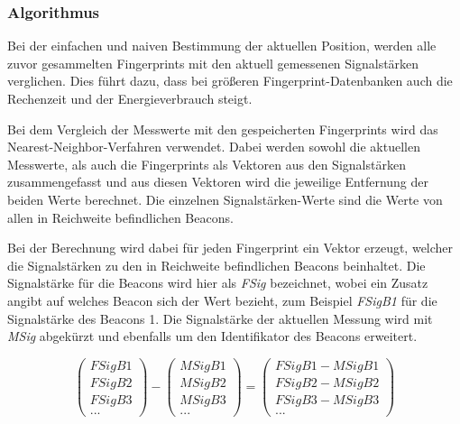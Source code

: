 \subsubsection{Algorithmus}
\label{sec:implementation:fingerprinting:positioning:naiv:algorithm}

Bei der einfachen und naiven Bestimmung der aktuellen Position, werden alle zuvor gesammelten Fingerprints mit den aktuell gemessenen Signalstärken verglichen. Dies führt dazu, dass bei größeren Fingerprint-Datenbanken auch die Rechenzeit und der Energieverbrauch steigt. 

Bei dem Vergleich der Messwerte mit den gespeicherten Fingerprints wird das Nearest-Neighbor-Verfahren verwendet. Dabei werden sowohl die aktuellen Messwerte, als auch die Fingerprints als Vektoren aus den Signalstärken zusammengefasst und aus diesen Vektoren wird die jeweilige Entfernung der beiden Werte berechnet. Die einzelnen Signalstärken-Werte sind die Werte von allen in Reichweite befindlichen Beacons.

Bei der Berechnung wird dabei für jeden Fingerprint ein Vektor erzeugt, welcher die Signalstärken zu den in Reichweite befindlichen Beacons beinhaltet.
Die Signalstärke für die Beacons wird hier als \emph{FSig} bezeichnet, wobei ein Zusatz angibt auf welches Beacon sich der Wert bezieht, zum Beispiel \emph{FSigB1} für die Signalstärke des Beacons 1.
Die Signalstärke der aktuellen Messung wird mit \emph{MSig} abgekürzt und ebenfalls um den Identifikator des Beacons erweitert.


\begin{equation}
	\begin{pmatrix}
		FSigB1 \\
		FSigB2 \\
		FSigB3 \\
		...
	\end{pmatrix} -
	\begin{pmatrix}
		MSigB1 \\
		MSigB2 \\
		MSigB3 \\
		...
	\end{pmatrix}
	= 
	\begin{pmatrix}
		FSigB1 - MSigB1 \\
		FSigB2 - MSigB2 \\
		FSigB3 - MSigB3 \\
		...
	\end{pmatrix}
\end{equation}

